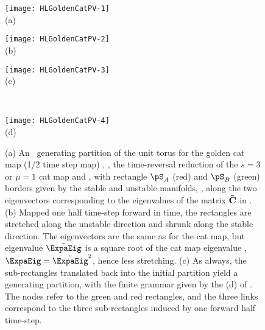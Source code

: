 \begin{description}
\begin{figure}\begin{center}
            \begin{minipage}[c]{0.25\textwidth}\begin{center}
\texttt{[image: HLGoldenCatPV-1]}\\(a)
            \end{center}\end{minipage}
            \begin{minipage}[c]{0.25\textwidth}\begin{center}
\texttt{[image: HLGoldenCatPV-2]}\\(b)
            \end{center}\end{minipage}
            \begin{minipage}[c]{0.25\textwidth}\begin{center}
\texttt{[image: HLGoldenCatPV-3]}\\(c)
            \end{center}\end{minipage}
            ~~~
            \begin{minipage}[c]{0.6\textwidth}\begin{center}
\texttt{[image: HLGoldenCatPV-4]}\\(d)
            \end{center}\end{minipage}
\end{center}
  \caption{\label{fig:GoldenCatPV}
(a)
An \AW\ generating partition of the unit torus for the golden cat map
(1/2 time step map) , ,
the time-reversal reduction of the $s=3$  or $\mu=1$
{\PV} cat map  and , with
rectangle $\pS_A$ (red) and $\pS_B$ (green) borders given by the
stable and unstable manifolds, \ie, along the two eigenvectors
corresponding to the eigenvalues of the matrix ${\bf \tilde{C}}$ in
.
(b)
Mapped one half time-step forward in time, the rectangles are stretched along the
unstable direction and shrunk along the stable direction. The
eigenvectors are the same as for the {\PV} cat map, but eigenvalue
$\tilde{\ExpaEig}$  is a square root of the {\PV}
cat map eigenvalue , $\ExpaEig= \tilde{\ExpaEig}^2$,
hence less stretching.
(c)
 As always, the sub-rectangles translated back into the initial partition
yield a generating partition, with the finite grammar given by the
{\markGraph}
(d)
of . The nodes refer to the green and red
rectangles,  %
and the three links correspond to the three
sub-rectangles induced by one forward half time-step.
}
\end{figure}



\end{description}
